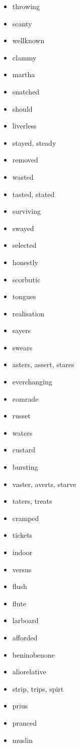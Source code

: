 \documentclass{article}
\begin{document}
\begin{itemize}
    \item throwing
    \item scanty
    \item wellknown
    \item clammy
    \item martha
    \item snatched
    \item should
    \item liverless
    \item stayed, steady
    \item removed
    \item wasted
    \item tasted, stated
    \item surviving
    \item swayed
    \item selected
    \item honestly
    \item scorbutic
    \item tongues
    \item realisation
    \item sayers
    \item swears
    \item asters, assert, stares
    \item everchanging
    \item comrade
    \item russet
    \item waters
    \item custard
    \item bursting
    \item vaster, averts, starve
    \item taters, treats
    \item cramped
    \item tickets
    \item indoor
    \item versus
    \item flush
    \item flute
    \item larboard
    \item afforded
    \item beninobenone
    \item aliorelative
    \item strip, trips, spirt
    \item prius
    \item pranced
    \item muslin

\end{itemize}
\end{document}
